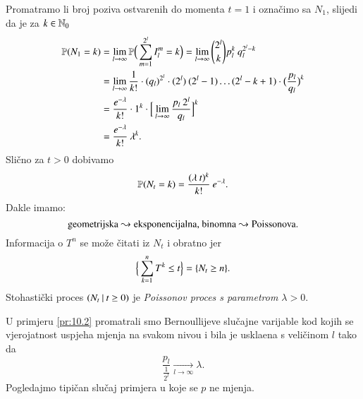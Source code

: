 \begin{pr}
    Promatramo li broj poziva ostvarenih do momenta $t = 1$ i ozna\v cimo sa $N_1$, slijedi da je za $k \in \mathbb{N}_0$
    \begin{equation*}
        \begin{aligned}
            \mathbb{P}({N_1 = k}) &= \lim\limits_{l \to \infty} \mathbb{P} \Big(\sum\limits_{m = 1}^{2^l} I_l^m = k \Big) = \lim\limits_{l \to \infty} {2^l \choose k} p_l^k \: q_l^{2^l - k}\\
            &= \lim\limits_{l \to \infty} \frac{1}{k!} \cdot (q_l)^{2^l} \cdot (2^l) \: (2^l - 1) \ldots (2^l - k + 1) \cdot \big( \frac{p_l}{q_l} \big)^k\\
            &= \frac{e^{-\lambda}}{k!} \cdot 1^k \cdot \Big[ \lim\limits_{l \to \infty} \frac{p_l \: 2^l}{q_l} \Big]^k\\
            &= \frac{e^{-\lambda}}{k!} \: \lambda^k.
        \end{aligned}
    \end{equation*}
    Sli\v cno za $t > 0$ dobivamo
    \begin{equation*}
        \mathbb{P}({N_t = k}) = \frac{(\lambda \: t)^k}{k!} \: e^{-\lambda}.
    \end{equation*}
    Dakle imamo:
    \begin{equation*}
        \textnormal{geometrijska} \leadsto \textnormal{eksponencijalna, binomna} \leadsto \textnormal{Poissonova}.
    \end{equation*}
    Informacija o $T^n$ se mo\v ze \v citati iz $N_t$ i obratno jer 
    \begin{equation*}
        \Big\{ \sum\limits_{k = 1}^{n} T^k \leq t \Big\} = \{ N_t \geq n \}.
    \end{equation*}
    Stohasti\v cki proces $({N_t} \: | \: {t \geq 0})$ je \emph{Poissonov proces s parametrom $\lambda > 0$}.
\end{pr}

U primjeru \ref{pr:10.2} promatrali smo Bernoullijeve slu\v cajne varijable kod kojih se vjerojatnost uspjeha mjenja na svakom nivou i bila je uskla\dj ena s veli\v cinom $l$ tako da
\begin{equation*}
    \frac{p_l}{\frac{1}{2^l}} \xrightarrow[l \to \infty]{} \lambda.
\end{equation*}
Pogledajmo tipi\v can slu\v caj primjera u koje se $p$ ne mjenja.

